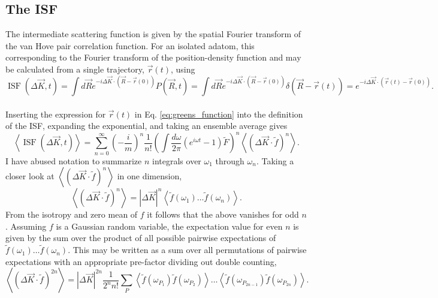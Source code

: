 \documentclass[7pt]{article}
\newcommand*{\ISF}{\operatorname{ISF}}
\begin{document}
\subsection{The ISF}

The intermediate scattering function is given by the spatial Fourier transform of the van Hove pair correlation function. For an isolated adatom, this corresponding to the Fourier transform of the position-density function and may be calculated from a single trajectory, $\vec{r}(t)$, using
\\
\begin{equation}
	\ISF(\Delta \vec{K}, t) = \int d\vec{R} e^{-i \Delta \vec{K} \cdot \left(\vec{R} - \vec{r}(0)\right)} P(\vec{R}, t) = \int d\vec{R} e^{-i \Delta \vec{K} \cdot \left(\vec{R} - \vec{r}(0)\right)} \delta(\vec{R} - \vec{r}(t)) = e^{-i \Delta \vec{K} \cdot \left(\vec{r}(t) - \vec{r}(0)\right)}.
	\label{eq:isf_definition}
\end{equation}
\\
Inserting the expression for $\vec{r}(t)$ in Eq. \ref{eq:greens_function} into the definition of the ISF, expanding the exponential, and taking an ensemble average gives
\begin{equation}
	\left<\ISF(\Delta \vec{K}, t)\right> = \sum_{n=0}^{\infty} \left(- \frac{i}{m}\right)^n \frac{1}{n!} \left( \int \frac{d\omega}{2\pi} \left(e^{i\omega t} - 1\right) \tilde{F}\right)^n \left< \left(\Delta \vec{K} \cdot \tilde{f}\right)^n\right>.
	\label{eq:isf_1}
\end{equation}
I have abused notation to summarize $n$ integrals over $\omega_1$ through $\omega_n$. Taking a closer look at $\left< \left(\Delta \vec{K} \cdot \tilde{f}\right)^n\right>$ in one dimension,
\begin{equation}
	\left< \left(\Delta \vec{K} \cdot \tilde{f}\right)^n\right> = \left|\Delta{\vec{K}}\right|^n \left< \tilde{f}\left(\omega_1\right) \ldots \tilde{f}\left(\omega_n\right)\right>.
\end{equation}
From the isotropy and zero mean of $f$ it follows that the above vanishes for odd $n$. Assuming $f$ is a Gaussian random variable, the expectation value for even $n$ is given by the sum over the product of all possible pairwise expectations of $\tilde{f}\left(\omega_1\right) \ldots \tilde{f}\left(\omega_n\right)$. This may be written as a sum over all permutations of pairwise expectations with an appropriate pre-factor dividing out double counting,
\begin{equation}
	\left< \left(\Delta \vec{K} \cdot \tilde{f}\right)^{2n}\right> = \left|\Delta \vec{K}\right|^{2n} \frac{1}{2^nn!} \sum_P \left< \tilde{f}\left(\omega_{P_1}\right) \tilde{f}\left(\omega_{P_2}\right)\right> \ldots \left< \tilde{f}\left(\omega_{P_{2n-1}}\right) \tilde{f}\left(\omega_{P_{2n}}\right)\right>.
\end{equation}
\end{document}
